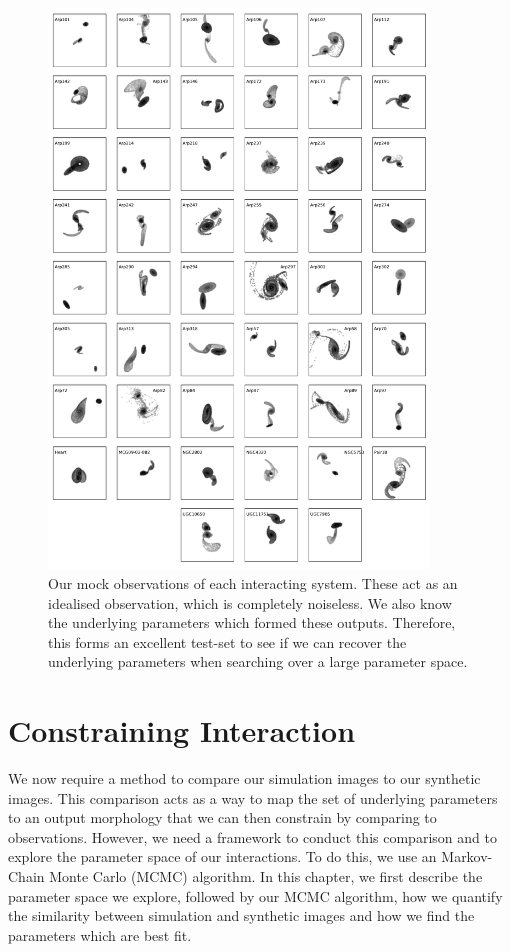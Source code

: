 \begin{figure}
\centering
\includegraphics[width=0.90\textwidth]{Chapter1/figures/mock-images.pdf}
\caption[Our mock observations of each interacting system.]{Our mock observations of each interacting system. These act as an idealised observation, which is completely noiseless. We also know the underlying parameters which formed these outputs. Therefore, this forms an excellent test-set to see if we can recover the underlying parameters when searching over a large parameter space.}
\label{fig:Obj_Cutout}
\end{figure}

\section{Constraining Interaction}\label{method:constraint}
We now require a method to compare our simulation images to our synthetic images. This comparison acts as a way to map the set of underlying parameters to an output morphology that we can then constrain by comparing to observations. However, we need a framework to conduct this comparison and to explore the parameter space of our interactions. To do this, we use an Markov-Chain Monte Carlo (MCMC) algorithm. In this chapter, we first describe the parameter space we explore, followed by our MCMC algorithm, how we quantify the similarity between simulation and synthetic images and how we find the parameters which are best fit.

